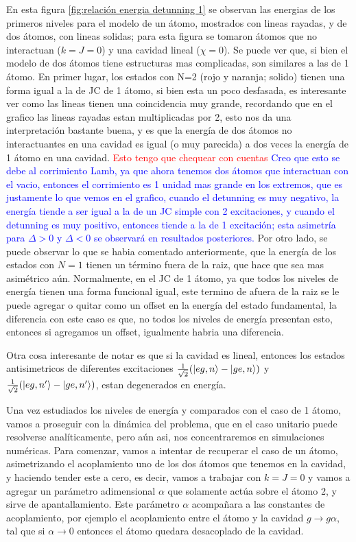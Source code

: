 En esta figura \ref{fig:relación energia detunning 1} se observan las energias de los primeros niveles para el modelo de un átomo, mostrados con lineas rayadas, y de dos átomos, con lineas solidas; para esta figura se tomaron átomos que no interactuan ($k=J=0$) y una cavidad lineal ($\chi=0$). Se puede ver que, si bien el modelo de dos átomos tiene estructuras mas complicadas, son similares a las de 1 átomo. En primer lugar, los estados con N=2 (rojo y naranja; solido) tienen una forma igual a la de JC de 1 átomo, si bien esta un poco desfasada, es interesante ver como las lineas tienen una coincidencia muy grande, recordando que en el grafico las lineas rayadas estan multiplicadas por 2, esto nos da una interpretación bastante buena, y es que la energía de dos átomos no interactuantes en una cavidad es igual (o muy parecida) a dos veces la energía de 1 átomo en una cavidad. \textcolor{red}{Esto tengo que chequear con cuentas} \textcolor{blue}{Creo que esto se debe al corrimiento Lamb, ya que ahora tenemos dos átomos que interactuan con el vacio, entonces el corrimiento es 1 unidad mas grande en los extremos, que es justamente lo que vemos en el grafico, cuando el detunning es muy negativo, la energ\'ia tiende a ser igual a la de un JC simple con 2 excitaciones, y cuando el detunning es muy positivo, entonces tiende a la de 1 excitaci\'on; esta asimetr\'ia para $\Delta>0$ y $\Delta<0$ se observar\'a en resultados posteriores.} Por otro lado, se puede observar lo que se habia comentado anteriormente, que la energ\'ia de los estados con $N=1$ tienen un t\'ermino fuera de la raiz, que hace que sea mas asim\'etrico a\'un. Normalmente, en el JC de 1 átomo, ya que todos los niveles de energía tienen una forma funcional igual, este termino de afuera de la raiz se le puede agregar o quitar como un offset en la energía del estado fundamental, la diferencia con este caso es que, no todos los niveles de energía presentan esto, entonces si agregamos un offset, igualmente habria una diferencia. 

Otra cosa interesante de notar es que si la cavidad es lineal, entonces los estados antisimetricos de diferentes excitaciones $\frac{1}{\sqrt{2}}(\ket{eg,n}-\ket{ge,n})$ y $\frac{1}{\sqrt{2}}(\ket{eg,n'}-\ket{ge,n'})$, estan degenerados en energía.

Una vez estudiados los niveles de energía y comparados con el caso de 1 átomo, vamos a proseguir con la dinámica del problema, que en el caso unitario puede resolverse analíticamente, pero a\'un asi, nos concentraremos en simulaciones numéricas.
Para comenzar, vamos a intentar de recuperar el caso de un átomo, asimetrizando el acoplamiento uno de los dos átomos que tenemos en la cavidad, y haciendo tender este a cero, es decir, vamos a trabajar con $k=J=0$ y vamos a agregar un parámetro adimensional $\alpha$ que solamente actúa sobre el átomo 2, y sirve de apantallamiento. Este parámetro $\alpha$ acompañara a las constantes de acoplamiento, por ejemplo el acoplamiento entre el átomo y la cavidad $g\rightarrow g\alpha$, tal que si $\alpha \rightarrow 0$ entonces el átomo quedara desacoplado de la cavidad. 

